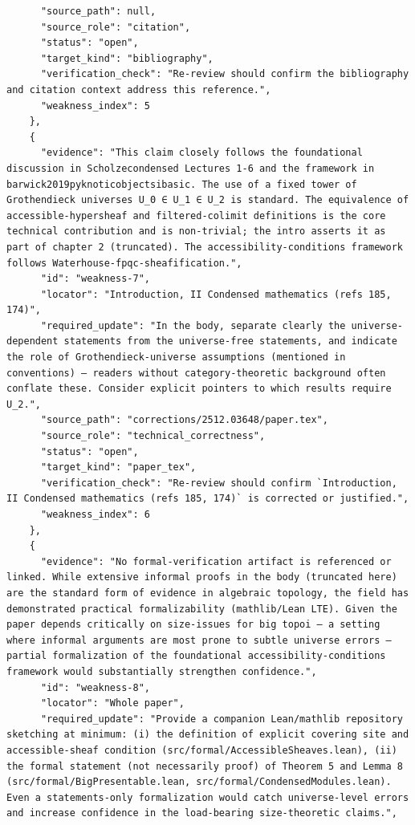 \documentclass[11pt]{article}
\begin{document}
\begin{verbatim}
      "source_path": null,
      "source_role": "citation",
      "status": "open",
      "target_kind": "bibliography",
      "verification_check": "Re-review should confirm the bibliography and citation context address this reference.",
      "weakness_index": 5
    },
    {
      "evidence": "This claim closely follows the foundational discussion in Scholzecondensed Lectures 1-6 and the framework in barwick2019pyknoticobjectsibasic. The use of a fixed tower of Grothendieck universes U_0 ∈ U_1 ∈ U_2 is standard. The equivalence of accessible-hypersheaf and filtered-colimit definitions is the core technical contribution and is non-trivial; the intro asserts it as part of chapter 2 (truncated). The accessibility-conditions framework follows Waterhouse-fpqc-sheafification.",
      "id": "weakness-7",
      "locator": "Introduction, II Condensed mathematics (refs 185, 174)",
      "required_update": "In the body, separate clearly the universe-dependent statements from the universe-free statements, and indicate the role of Grothendieck-universe assumptions (mentioned in conventions) — readers without category-theoretic background often conflate these. Consider explicit pointers to which results require U_2.",
      "source_path": "corrections/2512.03648/paper.tex",
      "source_role": "technical_correctness",
      "status": "open",
      "target_kind": "paper_tex",
      "verification_check": "Re-review should confirm `Introduction, II Condensed mathematics (refs 185, 174)` is corrected or justified.",
      "weakness_index": 6
    },
    {
      "evidence": "No formal-verification artifact is referenced or linked. While extensive informal proofs in the body (truncated here) are the standard form of evidence in algebraic topology, the field has demonstrated practical formalizability (mathlib/Lean LTE). Given the paper depends critically on size-issues for big topoi — a setting where informal arguments are most prone to subtle universe errors — partial formalization of the foundational accessibility-conditions framework would substantially strengthen confidence.",
      "id": "weakness-8",
      "locator": "Whole paper",
      "required_update": "Provide a companion Lean/mathlib repository sketching at minimum: (i) the definition of explicit covering site and accessible-sheaf condition (src/formal/AccessibleSheaves.lean), (ii) the formal statement (not necessarily proof) of Theorem 5 and Lemma 8 (src/formal/BigPresentable.lean, src/formal/CondensedModules.lean). Even a statements-only formalization would catch universe-level errors and increase confidence in the load-bearing size-theoretic claims.",

\end{verbatim}
\end{document}

